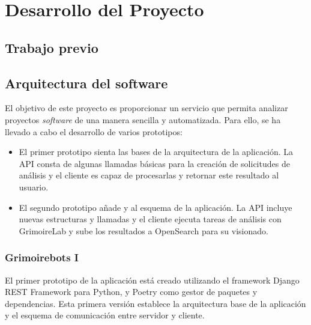 
\chapter{Desarrollo del Proyecto} %

\label{Chapter3} %


\section{Trabajo previo}


\section{Arquitectura del software}

El objetivo de este proyecto es proporcionar un servicio que permita analizar proyectos \emph{software} de una manera sencilla y automatizada. Para ello, se ha llevado a cabo el desarrollo de varios prototipos:

\begin{itemize}
    \item El primer prototipo sienta las bases de la arquitectura de la aplicación. La API consta de algunas llamadas básicas para la creación de solicitudes de análisis y el cliente es capaz de procesarlas y retornar este resultado al usuario.
    \item El segundo prototipo añade  y  al esquema de la aplicación. La API incluye nuevas estructuras y llamadas y el cliente ejecuta tareas de análisis con GrimoireLab y sube los resultados a OpenSearch para su visionado.
\end{itemize}

\subsection{Grimoirebots I}

El primer prototipo de la aplicación está creado utilizando el framework Django REST Framework para Python, y Poetry como gestor de paquetes y dependencias. Esta primera versión establece la arquitectura base de la aplicación y el esquema de comunicación entre servidor y cliente.

